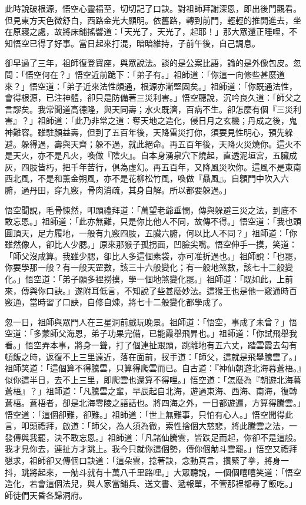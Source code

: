 此時說破根源，悟空心靈福至，切切記了口訣。對祖師拜謝深恩，即出後門觀看。但見東方天色微舒白，西路金光大顯明。依舊路，轉到前門，輕輕的推開進去，坐在原寢之處，故將床鋪搖響道：「天光了，天光了，起耶！」那大眾還正睡哩，不知悟空已得了好事。當日起來打混，暗暗維持，子前午後，自己調息。

卻早過了三年，祖師復登寶座，與眾說法。談的是公案比語，論的是外像包皮。忽問：「悟空何在？」悟空近前跪下：「弟子有。」祖師道：「你這一向修些甚麼道來？」悟空道：「弟子近來法性頗通，根源亦漸堅固矣。」祖師道：「你既通法性，會得根源，已注神體，卻只是防備著三災利害。」悟空聽說，沉吟良久道：「師父之言謬矣。我常聞道高德隆，與天同壽；水火既濟，百病不生。卻怎麼有個『三災利害』？」祖師道：「此乃非常之道：奪天地之造化，侵日月之玄機；丹成之後，鬼神難容。雖駐顏益壽，但到了五百年後，天降雷災打你，須要見性明心，預先躲避。躲得過，壽與天齊；躲不過，就此絕命。再五百年後，天降火災燒你。這火不是天火，亦不是凡火，喚做『陰火』。自本身湧泉穴下燒起，直透泥垣宮，五臟成灰，四肢皆朽，把千年苦行，俱為虛幻。再五百年，又降風災吹你。這風不是東南西北風，不是和薰金朔風，亦不是花柳松竹風，喚做『贔風』。自顖門中吹入六腑，過丹田，穿九竅，骨肉消疏，其身自解。所以都要躲過。」

悟空聞說，毛骨悚然，叩頭禮拜道：「萬望老爺垂憫，傳與躲避三災之法，到底不敢忘恩。」祖師道：「此亦無難，只是你比他人不同，故傳不得。」悟空道：「我也頭圓頂天，足方履地，一般有九竅四肢，五臟六腑，何以比人不同？」祖師道：「你雖然像人，卻比人少腮。」原來那猴子孤拐面，凹臉尖嘴。悟空伸手一摸，笑道：「師父沒成算。我雖少腮，卻比人多這個素袋，亦可准折過也。」祖師說：「也罷，你要學那一般？有一般天罡數，該三十六般變化；有一般地煞數，該七十二般變化。」悟空道：「弟子願多裡撈摸，學一個地煞變化罷。」祖師道：「既如此，上前來，傳與你口訣。」遂附耳低言，不知說了些甚麼妙法。這猴王也是他一竅通時百竅通，當時習了口訣，自修自煉，將七十二般變化都學成了。

忽一日，祖師與眾門人在三星洞前戲玩晚景。祖師道：「悟空，事成了未曾？」悟空道：「多蒙師父海恩，弟子功果完備，已能霞舉飛昇也。」祖師道：「你試飛舉我看。」悟空弄本事，將身一聳，打了個連扯跟頭，跳離地有五六丈，踏雲霞去勾有頓飯之時，返復不上三里遠近，落在面前，扠手道：「師父，這就是飛舉騰雲了。」祖師笑道：「這個算不得騰雲，只算得爬雲而已。自古道：『神仙朝遊北海暮蒼梧。』似你這半日，去不上三里，即爬雲也還算不得哩。」悟空道：「怎麼為『朝遊北海暮蒼梧』？」祖師道：「凡騰雲之輩，早辰起自北海，遊過東海、西海、南海，復轉蒼梧。蒼梧者，卻是北海零陵之語話也。將四海之外，一日都遊遍，方算得騰雲。」悟空道：「這個卻難，卻難。」祖師道：「世上無難事，只怕有心人。」悟空聞得此言，叩頭禮拜，啟道：「師父，為人須為徹，索性捨個大慈悲，將此騰雲之法，一發傳與我罷，決不敢忘恩。」祖師道：「凡諸仙騰雲，皆跌足而起，你卻不是這般。我才見你去，連扯方才跳上。我今只就你這個勢，傳你個觔斗雲罷。」悟空又禮拜懇求，祖師卻又傳個口訣道：「這朵雲，捻著訣，念動真言，攢緊了拳，將身一抖，跳將起來，一觔斗就有十萬八千里路哩。」大眾聽說，一個個嘻嘻笑道：「悟空造化，若會這個法兒，與人家當鋪兵、送文書、遞報單，不管那裡都尋了飯吃。」師徒們天昏各歸洞府。

